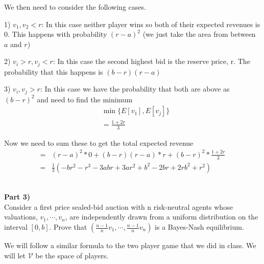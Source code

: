 \documentclass[12pt,letter]{article}
\newcommand{\ppart}[1]{\vspace{2mm}\large\textbf{\\Part {#1})\vspace{2mm}}\normalsize\\}
\begin{document}
We then need to consider the following cases.

1) $v_1,v_2<r$:
In this case neither player wins so both of their expected revenues is 0.
This happens with probability $(r-a)^2$ (we just take the area from between $a$ and
$r$)

2) $v_i>r,v_j<r$:
In this case the second highest bid is the reserve price, r. The probability that
this happens is $(b-r)(r-a)$ 

3) $v_i,v_j>r$:
In this case we have the probability that both are above as $(b-r)^2$ and need
to find the minimum
\begin{align*}
    &\min\{E[v_1],E[v_j]\}\\
    &= \frac{1+2r}{3}
\end{align*}

Now we need to sum these to get the total expected revenue
\begin{align*}
    =&(r-a)^2*0 + (b-r)(r-a)*r + (b-r)^2*\frac{1+2r}{3}\\
    =&\frac13\left(-br^2 -r^3 -3abr + 3ar^2 + b^2 -2br + 2rb^2 + r^2\right)
\end{align*}


\ppart{3}
Consider a first price sealed-bid auction with n risk-neutral agents whose 
valuations, $v_1,\cdots,v_n$, are independently drawn from a uniform distribution
on the interval $[0,b]$. Prove that $\left(\frac{n-1}{n}v_1,\cdots,\frac{n-1}{n}v_n\right)$ is a Bayes-Nash equilibrium.

We will follow a similar formula to the two player game that we did in class.
We will let $\mathcal{V}$ be the space of players.
\end{document}
